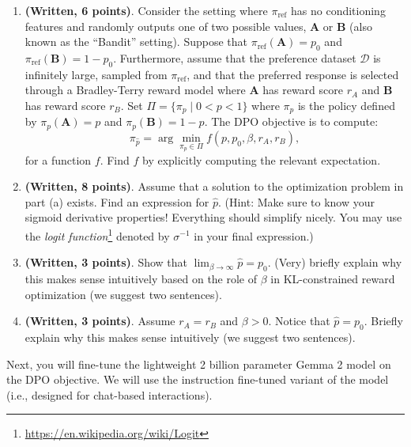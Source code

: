 \documentclass[
  letterpaper,
  numbers=noenddot,
  DIV=11]{scrreprt}
\theoremstyle{definition}
\theoremstyle{plain}
\theoremstyle{plain}
\theoremstyle{remark}
\DeclareRobustCommand{\href}[2]{#2\footnote{\url{#1}}}
\begin{document}
\begin{enumerate}
\def\labelenumi{(\alph{enumi})}
\item
  \textbf{(Written, 6 points)}. Consider the setting where
  \(\pi_{\text{ref}}\) has no conditioning features and randomly outputs
  one of two possible values, \(\mathbf{A}\) or \(\mathbf{B}\) (also
  known as the ``Bandit'' setting). Suppose that
  \(\pi_{\text{ref}}(\mathbf{A})=p_0\) and
  \(\pi_{\text{ref}}(\mathbf{B})=1-p_0\). Furthermore, assume that the
  preference dataset \(\mathcal{D}\) is infinitely large, sampled from
  \(\pi_{\text{ref}}\), and that the preferred response is selected
  through a Bradley-Terry reward model where \(\mathbf{A}\) has reward
  score \(r_A\) and \(\mathbf{B}\) has reward score \(r_B\). Set
  \(\Pi=\{\pi_p\mid 0<p<1\}\) where \(\pi_p\) is the policy defined by
  \(\pi_p(\mathbf{A})=p\) and \(\pi_p(\mathbf{B})=1-p\). The DPO
  objective is to compute:
  \[\pi_{\hat{p}}=\arg \min_{\pi_p\in \Pi} f(p, p_0, \beta, r_A, r_B),\]
  for a function \(f\). Find \(f\) by explicitly computing the relevant
  expectation.
\item
  \textbf{(Written, 8 points)}. Assume that a solution to the
  optimization problem in part (a) exists. Find an expression for
  \(\hat{p}\). (Hint: Make sure to know your sigmoid derivative
  properties! Everything should simplify nicely. You may use the
  \href{https://en.wikipedia.org/wiki/Logit}{\emph{logit function}}
  denoted by \(\sigma^{-1}\) in your final expression.)
\item
  \textbf{(Written, 3 points)}. Show that
  \(\lim_{\beta\to\infty}\hat{p}=p_0.\) (Very) briefly explain why this
  makes sense intuitively based on the role of \(\beta\) in
  KL-constrained reward optimization (we suggest two sentences).
\item
  \textbf{(Written, 3 points)}. Assume \(r_A=r_B\) and \(\beta>0\).
  Notice that \(\hat{p}=p_0\). Briefly explain why this makes sense
  intuitively (we suggest two sentences).
\end{enumerate}

Next, you will fine-tune the lightweight 2 billion parameter Gemma 2
model on the DPO objective. We will use the instruction fine-tuned
variant of the model (i.e., designed for chat-based interactions).
\end{document}
